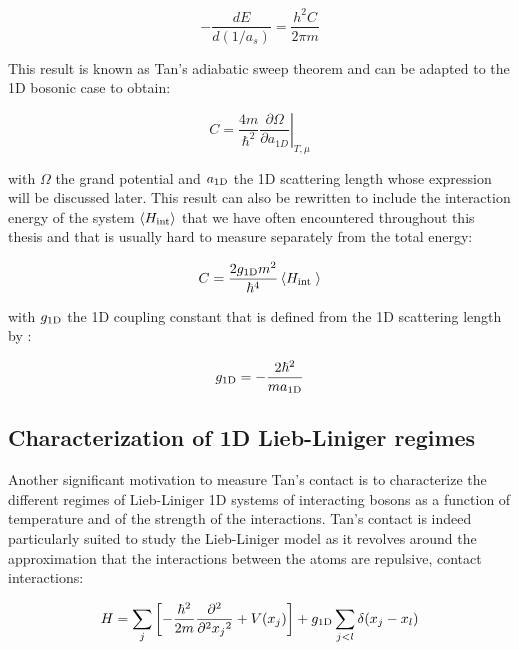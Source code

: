 \begin{equation}
    -\frac{d E}{d(1 / a_s)}=\frac{h^{2} C}{2 \pi m}
\end{equation}

\noindent This result is known as Tan's adiabatic sweep theorem and can be adapted to the 1D bosonic case \cite{barth2011tan} to obtain:

\begin{equation}
    C=\left.\frac{4 m}{\hbar^{2}} \frac{\partial \Omega}{\partial a_{1 D}}\right|_{T, \mu}
\end{equation}

\noindent with $\Omega$ the grand potential and $a_{\rm{1D}}$ the 1D scattering length whose expression will be discussed later. This result can also be rewritten \cite{yao:tel-03065015} to include the interaction energy of the system $\langle H_{\rm{int}}\rangle$ that we have often encountered throughout this thesis and that is usually hard to measure separately from the total energy:

\begin{equation}
    C=\frac{2 g_{\rm{1D}} m^{2}}{\hbar^{4}}\left\langle H_{\text {int }}\right\rangle
    \label{eq:C_with_int}
\end{equation}

\noindent with $g_{\rm{1D}}$ the 1D coupling constant that is defined from the 1D scattering length by \cite{olshanii1998atomic}:

\begin{equation}
    g_{\rm{1D}}=-\frac{2 \hbar^2}{m a_{\rm{1D}}}
\end{equation}

\subsection{Characterization of 1D Lieb-Liniger regimes}

Another significant motivation to measure Tan's contact is to characterize the different regimes of Lieb-Liniger 1D systems of interacting bosons as a function of temperature and of the strength of the interactions. Tan's contact is indeed particularly suited to study the Lieb-Liniger model \cite{lieb1963exact} as it revolves around the approximation that the interactions between the atoms are repulsive, contact interactions:

\begin{equation}
    H = \sum_j \left[ - \frac{ \hbar^2}{2m} \frac{\partial^2}{\partial^2 {x_j}^2} + V(x_j) \right] + g_{\rm{1D}} \sum_{j<l} \delta(x_j - x_l) 
    \label{eq:lieb_liniger}
\end{equation}

